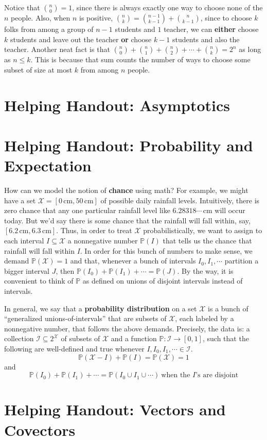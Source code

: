 \documentclass{article}
\newcommand{\PP}{\mathbb{P}}
\newcommand{\Ii}{\mathcal{I}}
\newcommand{\Xx}{\mathcal{X}}
\begin{document}
        Notice that ${n \choose 0} = 1$, since there is always exactly one way
        to choose none of the $n$ people.
        Also, when $n$ is positive, ${n\choose k} = {n-1\choose k-1} +
        {n\choose k-1}$, since to choose $k$ folks from among a group of $n-1$
        students and $1$ teacher, we can \textbf{either} choose $k$ students
        and leave out the teacher \textbf{or} choose $k-1$ students and also
        the teacher.
        Another neat fact is that
        $
            {n\choose 0} + {n\choose 1} + {n\choose 2} + \cdots + {n\choose k}
            = 2^n
        $
        as long as $n\leq k$.  This is because that sum
        counts the number of ways to choose some subset of size at
        most $k$ from among $n$ people.  

    \section*{Helping Handout: Asymptotics}

    \section*{Helping Handout: Probability and Expectation}
        How can we model the notion of \textbf{chance} using math?
        For example, we might have a set $\Xx=[0\,\text{cm}, 50\,\text{cm}]$ of
        possible daily rainfall levels.  Intuitively, there is zero chance that
        any one particular rainfall level like $6.28318\cdots\,\text{cm}$ will
        occur today.  But we'd say there is some chance that the rainfall will
        fall within, say, $[6.2\,\text{cm}, 6.3\,\text{cm}]$.
        Thus, in order to treat $\Xx$ probabilistically, we want to assign to
        each interval $I \subseteq \Xx$ a nonnegative number $\PP(I)$ that
        tells us the chance that rainfall will fall within $I$.  In order for
        this bunch of numbers to make sense, we demand $\PP(\Xx)=1$ and that,
        whenever a bunch of intervals $I_0, I_1, \cdots$ partition a bigger
        interval $J$, then $\PP(I_0) + \PP(I_1) + \cdots = \PP(J)$.
        By the way, it is convenient to think of $\PP$ as defined on unions of
        disjoint intervals instead of intervals.

        In general, we say that a \textbf{probability distribution} on a set
        $\Xx$ is a bunch of ``generalized unions-of-intervals'' that are
        subsets of $\Xx$, each labeled by a nonnegative number, that follows
        the above demands.  Precisely, the data is: a collection $\Ii \subseteq
        2^\Xx$ of subsets of $\Xx$ and a function $\PP:\Ii\to [0, 1]$, such
        that the following are well-defined and true whenever $I, I_0, I_1,
        \cdots \in \Ii$.
        $$ 
            \PP(\Xx - I) + \PP(I) = \PP(\Xx) = 1 
        $$
        and
        $$
            \PP(I_0) + \PP(I_1) + \cdots = \PP(I_0 \cup I_1 \cup \cdots)
            ~ \text{when the $I$'s are disjoint}
        $$

    \section*{Helping Handout: Vectors and Covectors}
    
\end{document}
